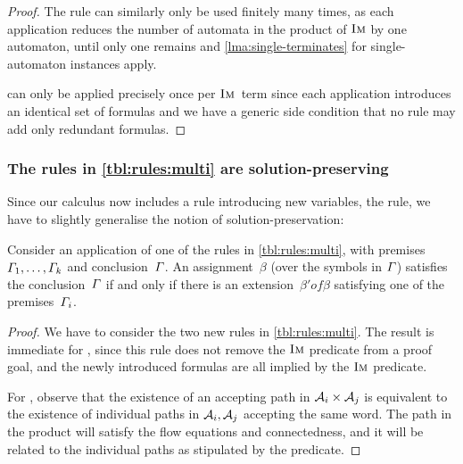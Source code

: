 \begin{proof}
  The rule \Materialise{} can similarly only be used finitely many times, as
  each application reduces the number of automata in the product of $\operatorname{\textsc{Im}}$ by
  one automaton, until only one remains and \cref{lma:single-terminates} for
  single-automaton instances apply.
  
  \ExpandM{} can only be applied precisely once per $\operatorname{\textsc{Im}}$~term since
  each application introduces an identical set of formulas and we have a generic
  side condition that no rule may add only redundant formulas.
\end{proof}

\subsubsection{The rules in \cref{tbl:rules:multi} are solution-preserving}

Since our calculus now includes a rule introducing new variables, the
\Materialise{} rule, we have to slightly generalise the notion of
solution-preservation:
%
\begin{lemma}\label{lma:multi-correct}
  Consider an application of one of the rules in
  \cref{tbl:rules:multi}, with
  premises~$\varGamma_1, \ldots, \varGamma_k$ and
  conclusion~$\varGamma$. An assignment~$\beta$ (over the symbols in
  $\varGamma$) satisfies the conclusion~$\varGamma$ if and only if
  there is an extension~$\beta' of \beta$ satisfying one of the
  premises~$\varGamma_i$.
\end{lemma}

\begin{proof}
  We have to consider the two new rules in \cref{tbl:rules:multi}. The
  result is immediate for \ExpandM{}, since this rule does not remove the
  $\operatorname{\textsc{Im}}$ predicate from a proof goal, and the newly introduced formulas
  are all implied by the $\operatorname{\textsc{Im}}$ predicate.

  For \Materialise{}, observe that the existence of an accepting path
  in $\mathcal{A}_i \times \mathcal{A}_j$ is equivalent to the existence
  of individual paths in $\mathcal{A}_i, \mathcal{A}_j$ accepting the
  same word. The path in the product will satisfy the flow equations
  and connectedness, and it will be related to the individual paths as
  stipulated by the \BindingSum{} predicate.
\end{proof}

